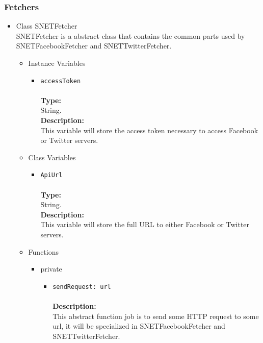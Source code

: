 \subsubsection{Fetchers}
\label{sec-1-4-1}
\begin{itemize}

\item Class SNETFetcher\\
\label{sec-1-4-1-1}%
SNETFetcher is a abstract class that contains the common parts used by SNETFacebookFetcher and SNETTwitterFetcher.

\begin{itemize}

\item Instance Variables
\label{sec-1-4-1-1-1}%
\begin{itemize}
\item \verb~accessToken~\\\\
\textbf{Type:}\\
     String.\\

     \textbf{Description:}\\
     This variable will store the access token necessary to access Facebook or Twitter servers.
\end{itemize}


\item Class Variables
\label{sec-1-4-1-1-2}%
\begin{itemize}
\item \verb~ApiUrl~\\\\
\textbf{Type:}\\
     String.\\

     \textbf{Description:}\\
     This variable will store the full URL to either Facebook or Twitter servers.
\end{itemize}


\item Functions
\label{sec-1-4-1-1-3}%
\begin{itemize}

\item private
\label{sec-1-4-1-1-3-1}%
\begin{itemize}
\item \verb~sendRequest: url~\\\\
\textbf{Description:}\\
      This abstract function job is to send some HTTP request to some url, it will be specialized in SNETFacebookFetcher and SNETTwitterFetcher.
\end{itemize}



\end{itemize}
\end{itemize}
\end{itemize}
